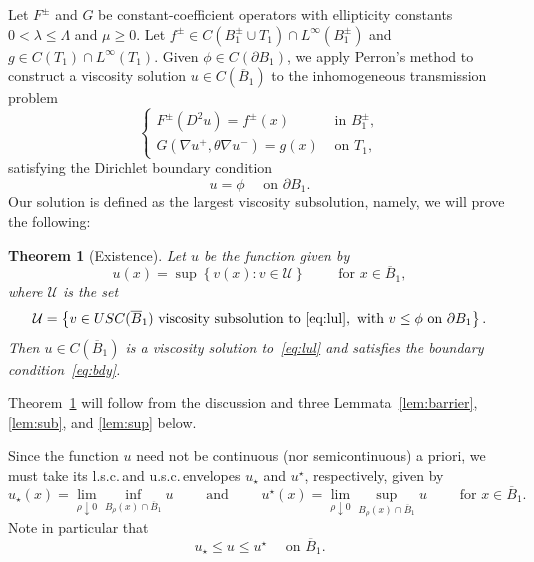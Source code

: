 \documentclass[letter,11pt]{amsart}
\newcommand{\usc}{u.s.c.\,}
\newcommand{\lsc}{l.s.c.\,}
\newcommand{\uppers}{USC}
\newcommand{\subsol}{\mathcal{U}}
\newtheorem{thm}{Theorem}[section]
\theoremstyle{definition}
\numberwithin{equation}{section}
\begin{document}
Let $F^{\pm}$ and $G$ be constant-coefficient operators with ellipticity constants $0 < \lambda \leq \Lambda$ and $\mu \geq 0$.
Let $f^{\pm} \in C(B_1^{\pm} \cup T_1) \cap L^{\infty}(B_1^{\pm})$ and $g \in C(T_1) \cap L^{\infty}(T_1)$.
Given $\phi \in C(\partial B_1)$, we apply Perron's method to construct a viscosity solution $u \in C(\overline{B}_1)$ to the inhomogeneous transmission problem
\begin{equation}
\label{eq:lul}
\begin{cases}
F^{\pm}(D^2 u) = f^{\pm}(x)& \text{ in } B_1^{\pm},\\
G(\nabla u^{+}, \theta \nabla u^{-}) = g(x) & \text{ on } T_1,
\end{cases}
\end{equation}
satisfying the Dirichlet boundary condition
\begin{equation}
\label{eq:bdy}
u = \phi \quad \text{ on } \partial B_1.
\end{equation}
Our solution is defined as the largest viscosity subsolution, namely, 
we will prove the following:

\begin{thm}[Existence]
\label{thm:existence}
Let $u$ be the function given by 
\[
u(x) =
\sup
\left\{
v(x)\colon
v \in \subsol\right\}
\qquad \text{ for } x \in \overline{B}_1,
\]
where $\subsol$ is the set
\[
\subsol = \left\{
v \in \uppers(\overline{B}_1)
\text{ viscosity subsolution to~\eqref{eq:lul}}, \text{ with } v \leq \phi \text{ on } \partial B_1
\right\}.
\]
Then $u \in C(\overline{B}_1)$ is a viscosity solution to~\eqref{eq:lul} and satisfies the boundary condition~\eqref{eq:bdy}.
\end{thm}

\medskip

Theorem~\ref{thm:existence} will follow from the discussion and three Lemmata~\ref{lem:barrier}, \ref{lem:sub}, and \ref{lem:sup} below.

\medskip

Since the function $u$ need not be continuous (nor semicontinuous) a priori, we must take its \lsc and \usc envelopes $u_{\star}$ and $u^{\star}$, respectively, given by
\[
u_{\star}(x) = \lim_{\rho \downarrow 0} \inf_{B_{\rho}(x) \cap \overline{B}_1} u 
 \qquad \text{ and } \qquad
u^{\star}(x) = \lim_{\rho \downarrow 0} \sup_{B_{\rho}(x) \cap \overline{B}_1} u
\qquad
\text{ for } x \in \overline{B}_1.
\]
Note in particular that
\[
u_{\star} \leq u \leq u^{\star} \quad \text{ on } \overline{B}_1.
\]

\medskip
\end{document}
